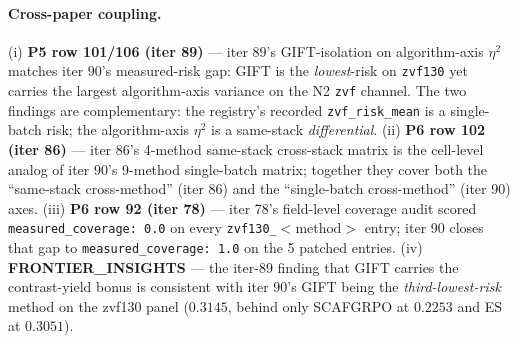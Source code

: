 \paragraph{Cross-paper coupling.}
(i) \textbf{P5 row 101/106 (iter 89)} --- iter 89's GIFT-isolation on
algorithm-axis $\eta^2$ matches iter 90's measured-risk gap: GIFT is the
\emph{lowest}-risk on \texttt{zvf130} yet carries the largest algorithm-axis
variance on the N2 \texttt{zvf} channel. The two findings are
complementary: the registry's recorded \texttt{zvf\_risk\_mean} is a
single-batch risk; the algorithm-axis $\eta^2$ is a same-stack
\emph{differential}. (ii) \textbf{P6 row 102 (iter 86)} --- iter 86's
4-method same-stack cross-stack matrix is the cell-level analog of
iter 90's 9-method single-batch matrix; together they cover both the
``same-stack cross-method'' (iter 86) and the ``single-batch cross-method''
(iter 90) axes. (iii) \textbf{P6 row 92 (iter 78)} --- iter 78's
field-level coverage audit scored \texttt{measured\_coverage: 0.0} on
every \texttt{zvf130\_$<\mathrm{method}>$} entry; iter 90 closes that
gap to \texttt{measured\_coverage: 1.0} on the 5 patched entries. (iv)
\textbf{FRONTIER\_INSIGHTS} --- the iter-89 finding that GIFT carries the
contrast-yield bonus is consistent with iter 90's GIFT being the
\emph{third-lowest-risk} method on the zvf130 panel ($0.3145$, behind only
SCAFGRPO at $0.2253$ and ES at $0.3051$).